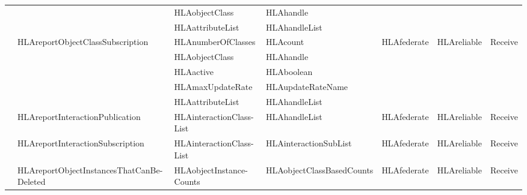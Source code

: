 \begin{landscape}
\begin{momtabletypeset}[8.00]
{{\begin{tabular}{|Y{116.92pt}|Y{137.54pt}|Y{76.22pt}|Y{103.88pt}|Y{65.90pt}|Y{66.32pt}|Y{38.52pt}|}
                    &                                                     & HLAobjectClass                    & HLAhandle                 &             &             &         \\
                    &                                                     & HLAattributeList                  & HLAhandleList             &             &             &         \\
                    & HLAreportObjectClassSubscription                    & HLAnumberOfClasses                & HLAcount                  & HLAfederate & HLAreliable & Receive \\
                    &                                                     & HLAobjectClass                    & HLAhandle                 &             &             &         \\
                    &                                                     & HLAactive                         & HLAboolean                &             &             &         \\
                    &                                                     & HLAmaxUpdateRate                  & HLAupdateRateName         &             &             &         \\
                    &                                                     & HLAattributeList                  & HLAhandleList             &             &             &         \\
                    & HLAreportInteractionPublication                     & HLAinteractionClass-\newline List & HLAhandleList & HLAfederate & HLAreliable & Receive \\
                    & HLAreportInteractionSubscription                    & HLAinteractionClass-\newline List & HLAinteractionSubList & HLAfederate & HLAreliable & Receive \\
                    & HLAreportObjectInstancesThatCanBe-\newline Deleted  & HLAobjectInstance-\newline Counts & HLAobjectClassBasedCounts & HLAfederate & HLAreliable & Receive \\
                    \hline
                \end{tabular}%
            }%
        }%
    \end{momtabletypeset}
    \newpage


\end{landscape}
